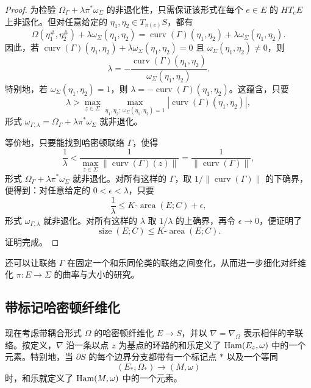\begin{proof}
为检验 $\Omega_\Gamma+\lambda\pi^*\omega_\Sigma$ 的非退化性，只需保证该形式在每个 $e\in E$ 的 $HT_eE$ 上非退化。但对任意给定的
$\eta_1,\eta_2\in T_{\pi(e)}S$，都有
\[
 \Omega(\eta_1^\#,\eta_2^\#)+\lambda\omega_\Sigma(\eta_1,\eta_2)
 =\operatorname{curv}(\Gamma)(\eta_1,\eta_2)
  +\lambda\omega_\Sigma(\eta_1,\eta_2).
\]
因此，若
$\operatorname{curv}(\Gamma)(\eta_1,\eta_2)
 +\lambda\omega_\Sigma(\eta_1,\eta_2)=0$ 且
$\omega_\Sigma(\eta_1,\eta_2)\ne0$，则
\[
 \lambda=-\frac{\operatorname{curv}(\Gamma)(\eta_1,\eta_2)}
 {\omega_\Sigma(\eta_1,\eta_2)}.
\]
特别地，若 $\omega_\Sigma(\eta_1,\eta_2)=1$，则
$\lambda=-\operatorname{curv}(\Gamma)(\eta_1,\eta_2)$。这蕴含，只要
\[
 \lambda>
 \max_{z\in\Sigma}
 \max_{\eta_1,\eta_2;\,\omega_\Sigma(\eta_1,\eta_2)=1}
 |\operatorname{curv}(\Gamma)(\eta_1,\eta_2)|,
\]
形式 $\omega_{\Gamma,\lambda}=\Omega_\Gamma+
\lambda\pi^*\omega_\Sigma$ 就非退化。

等价地，只要能找到哈密顿联络 $\Gamma$，使得
\[
 \frac1\lambda
 <\frac1{\displaystyle\max_{z\in\Sigma}
   \|\operatorname{curv}(\Gamma)(z)\|}
 =\frac1{\|\operatorname{curv}(\Gamma)\|},
\]
形式 $\Omega_\Gamma+\lambda\pi^*\omega_\Sigma$ 就非退化。对所有这样的
$\Gamma$，取 $1/\|\operatorname{curv}(\Gamma)\|$ 的下确界，便得到：对任意给定的 $0<\epsilon<\lambda$，只要
\[
 \frac1\lambda\leq K\text{-}\operatorname{area}(E;C)+\epsilon,
\]
形式 $\omega_{\Gamma,\lambda}$ 就非退化。对所有这样的 $\lambda$ 取
$1/\lambda$ 的上确界，再令 $\epsilon\to0$，便证明了
\[
 \operatorname{size}(E;C)
 \leq K\text{-}\operatorname{area}(E;C).
\]
证明完成。
\end{proof}

还可以让联络 $\Gamma$ 在固定一个和乐同伦类的联络之间变化，从而进一步细化对纤维化 $\pi:E\to\Sigma$ 的曲率与大小的研究。

\subsection{带标记哈密顿纤维化}
\label{subsec:marked-hamiltonian-fibration}

现在考虑带耦合形式 $\Omega$ 的哈密顿纤维化 $E\to S$，并以
$\nabla=\nabla_\Omega$ 表示相伴的辛联络。按定义，$\nabla$ 沿一条以点
$z$ 为基点的环路的和乐定义了 $\operatorname{Ham}(E_z,\omega)$ 中的一个元素。特别地，当
$\partial S$ 的每个边界分支都带有一个标记点 $*$ 以及一个等同
\[
 (E_*,\Omega_*)\longrightarrow(M,\omega)
\]
时，和乐就定义了 $\operatorname{Ham}(M,\omega)$ 中的一个元素。


